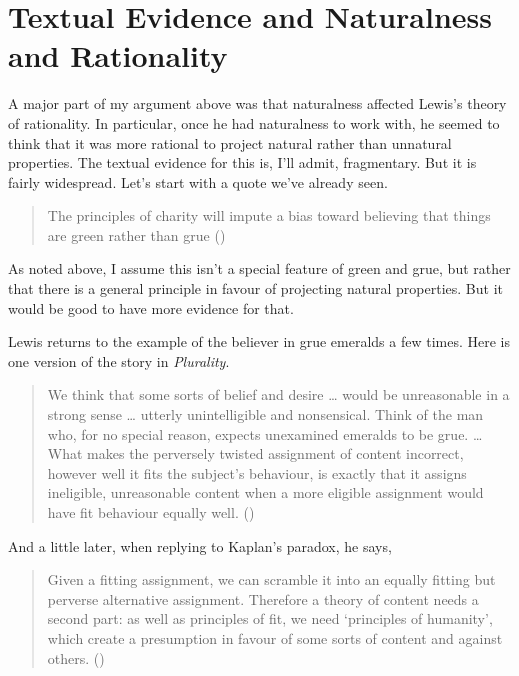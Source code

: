 \documentclass[
  11pt,
  letterpaper,
  DIV=11,
  numbers=noendperiod,
  twoside]{scrartcl}
\begin{document}
\section{Textual Evidence and Naturalness and
Rationality}\label{textual-evidence-and-naturalness-and-rationality}

A major part of my argument above was that naturalness affected Lewis's
theory of rationality. In particular, once he had naturalness to work
with, he seemed to think that it was more rational to project natural
rather than unnatural properties. The textual evidence for this is, I'll
admit, fragmentary. But it is fairly widespread. Let's start with a
quote we've already seen.

\begin{quote}
The principles of charity will impute a bias toward believing that
things are green rather than grue ()
\end{quote}

As noted above, I assume this isn't a special feature of green and grue,
but rather that there is a general principle in favour of projecting
natural properties. But it would be good to have more evidence for that.

Lewis returns to the example of the believer in grue emeralds a few
times. Here is one version of the story in \emph{Plurality}.

\begin{quote}
We think that some sorts of belief and desire \ldots{} would be
unreasonable in a strong sense \ldots{} utterly unintelligible and
nonsensical. Think of the man who, for no special reason, expects
unexamined emeralds to be grue. \ldots{} What makes the perversely
twisted assignment of content incorrect, however well it fits the
subject's behaviour, is exactly that it assigns ineligible, unreasonable
content when a more eligible assignment would have fit behaviour equally
well. ()
\end{quote}

And a little later, when replying to Kaplan's paradox, he says,

\begin{quote}
Given a fitting assignment, we can scramble it into an equally fitting
but perverse alternative assignment. Therefore a theory of content needs
a second part: as well as principles of fit, we need `principles of
humanity', which create a presumption in favour of some sorts of content
and against others. ()
\end{quote}
\end{document}
